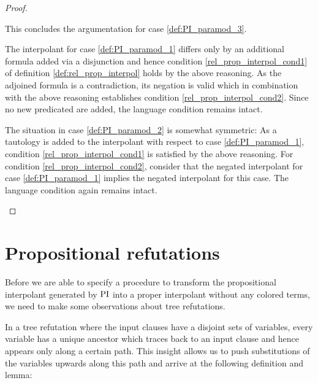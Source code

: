 \begin{proof}
\begin{itemize}
			This concludes the argumentation for case \ref{def:PI_paramod_3}. 

			The interpolant for case \ref{def:PI_paramod_1} differs only by an additional formula added via a disjunction and hence condition \ref{rel_prop_interpol_cond1} of definition \ref{def:rel_prop_interpol} holds by the above reasoning.
			As the adjoined formula is a contradiction, its negation is valid which in combination with the above reasoning establishes condition \ref{rel_prop_interpol_cond2}.
			Since no new predicated are added, the language condition remains intact. 

			The situation in case \ref{def:PI_paramod_2} is somewhat symmetric: 
			As a tautology is added to the interpolant with respect to case \ref{def:PI_paramod_1}, condition \ref{rel_prop_interpol_cond1} is satisfied by the above reasoning.
			For condition \ref{rel_prop_interpol_cond2}, consider that the negated interpolant for case \ref{def:PI_paramod_1} implies the negated interpolant for this case.
			The language condition again remains intact.
			\qedhere
	\end{itemize}
\end{proof}

\section{Propositional refutations}
Before we are able to specify a procedure to transform the propositional interpolant generated by $\operatorname{PI}$ into a proper interpolant without any colored terms,
we need to make some observations about tree refutations.

In a tree refutation where the input clauses have a disjoint sets of variables, every variable has a unique ancestor which traces back to an input clause and hence appears only along a certain path.
This insight allows us to push substitutions of the variables upwards along this path and arrive at the following definition and lemma:




